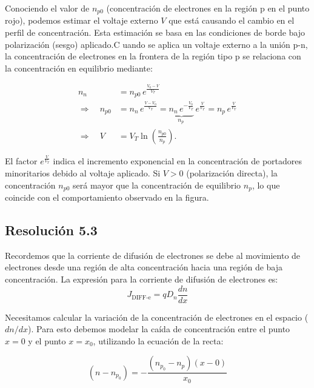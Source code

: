 \documentclass[
  11pt,
  letterpaper,
   addpoints,
  ]{exam}
\begin{document}
\begin{questions}
\begin{solution}
    Conociendo el valor de $n_{p0}$ (concentración de electrones en la región p en el punto rojo), podemos estimar el voltaje externo $V$ que está causando el cambio en el perfil de concentración. Esta estimación se basa en las condiciones de borde bajo polarización (sesgo) aplicado.C uando se aplica un voltaje externo a la unión p-n, la concentración de electrones en la frontera de la región tipo p se relaciona con la concentración en equilibrio mediante:

    \begin{align*}
    n_n &= n_{p0}\,e^{\frac{V_0 - V}{V_T}} \\[4pt]
    \Rightarrow\quad
    n_{p0} &= n_n\,e^{\frac{V - V_0}{V_T}}
           = \underbrace{n_n\,e^{-\frac{V_0}{V_T}}}_{\displaystyle n_p\ }\,
             e^{\frac{V}{V_T}}
           = n_p\,e^{\frac{V}{V_T}} \\[6pt]
    \Rightarrow\quad
    V &= V_T \ln\!\left(\frac{n_{p0}}{n_p}\right).
    \end{align*}

    El factor $e^{\frac{V}{V_T}}$ indica el incremento exponencial en la concentración de portadores minoritarios debido al voltaje aplicado. Si $V > 0$ (polarización directa), la concentración $n_{p0}$ será mayor que la concentración de equilibrio $n_p$, lo que coincide con el comportamiento observado en la figura.



    \subsection*{Resolución 5.3}
    Recordemos que la corriente de difusión de electrones se debe al movimiento de electrones desde una región de alta concentración hacia una región de baja concentración. La expresión para la corriente de difusión de electrones es:   
    \begin{equation}
        J_{\text{DIFF-e}} = qD_n\frac{dn}{dx} \tag{3}
    \end{equation}

    Necesitamos calcular la variación de la concentración de electrones en el espacio ($dn/dx$). Para esto debemos modelar la caída de concentración entre el punto $x=0$ y el punto $x=x_0$, utilizando la ecuación de la recta:

    \begin{equation}
        (n - n_{p_0}) = -\frac{(n_{p_0} - n_p)(x - 0)}{x_0}
    \end{equation}


\end{solution}
\end{questions}
\end{document}
